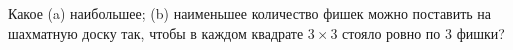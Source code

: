 Какое (a) наибольшее; (b) наименьшее количество фишек можно поставить на шахматную доску так, чтобы в каждом квадрате $3 \times 3$ стояло ровно по $3$ фишки?